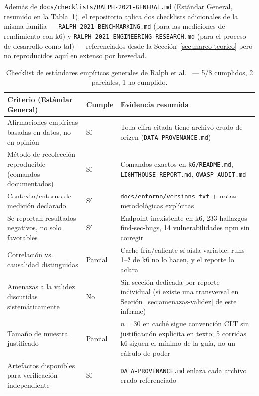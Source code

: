 Además de \texttt{docs/checklists/RALPH-2021-GENERAL.md} (Estándar General, resumido en la
Tabla~\ref{tab:ralph-general}), el repositorio aplica dos checklists adicionales de la misma familia
--- \texttt{RALPH-2021-BENCHMARKING.md} (para las mediciones de rendimiento con k6) y
\texttt{RALPH-2021-ENGINEERING-RESEARCH.md} (para el proceso de desarrollo como tal) --- referenciados
desde la Sección~\ref{sec:marco-teorico} pero no reproducidos aquí en extenso por brevedad.

\begin{table}[H]
\centering
\small
\begin{tabular}{p{7.5cm}p{1.3cm}p{5cm}}
\toprule
\textbf{Criterio (Estándar General)} & \textbf{Cumple} & \textbf{Evidencia resumida} \\
\midrule
Afirmaciones empíricas basadas en datos, no en opinión & Sí & Toda cifra citada tiene archivo crudo de origen (\texttt{DATA-PROVENANCE.md}) \\
Método de recolección reproducible (comandos documentados) & Sí & Comandos exactos en \texttt{k6/README.md}, \texttt{LIGHTHOUSE-REPORT.md}, \texttt{OWASP-AUDIT.md} \\
Contexto/entorno de medición declarado & Sí & \texttt{docs/entorno/versions.txt} + notas metodológicas explícitas \\
Se reportan resultados negativos, no solo favorables & Sí & Endpoint inexistente en k6, 233 hallazgos find-sec-bugs, 14 vulnerabilidades npm sin corregir \\
Correlación vs. causalidad distinguidas & Parcial & Cache fría/caliente sí aísla variable; runs 1--2 de k6 no lo hacen, y el reporte lo aclara \\
Amenazas a la validez discutidas sistemáticamente & No & Sin sección dedicada por reporte individual (sí existe una transversal en Sección~\ref{sec:amenazas-validez} de este informe) \\
Tamaño de muestra justificado & Parcial & $n=30$ en caché sigue convención CLT sin justificación explícita en texto; 5 corridas k6 siguen el mínimo de la guía, no un cálculo de poder \\
Artefactos disponibles para verificación independiente & Sí & \texttt{DATA-PROVENANCE.md} enlaza cada archivo crudo referenciado \\
\bottomrule
\end{tabular}
\caption{Checklist de estándares empíricos generales de Ralph et al.~\cite{ralph2021} --- 5/8 cumplidos, 2 parciales, 1 no cumplido.}
\label{tab:ralph-general}
\end{table}

